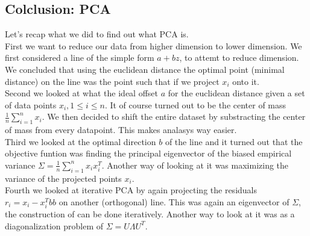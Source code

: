 		\subsection{Colclusion: PCA}
		Let's recap what we did to find out what PCA is.\\
		
		 First we want to reduce our data from higher dimension to lower dimension. We first considered a line of the simple form $a+bz$, to attemt to reduce dimension. We concluded that using the euclidean distance the optimal point (minimal distance) on the line was the point such that if we project $x_i$ onto it.\\
		 
		 Second we looked at what the ideal offset $a$ for the euclidean distance given a set of data points $x_i, 1\leq i \leq n$. It of course turned out to be the center of mass $\frac{1}{n}\sum_{i=1}^{n}x_i$. We then decided to shift the entire dataset by substracting the center of mass from every datapoint. This makes analasys way easier.\\
		 
		 Third we looked at the optimal direction $b$ of the line and it turned out that the objective funtion was finding the principal eigenvector of the biased empirical variance $\Sigma = \frac{1}{n}\sum_{i=1}^{n}x_ix_i^T$. Another way of looking at it was maximizing the variance of the projected points $x_i$.\\
		 
		 Fourth we looked at iterative PCA by again projecting the residuals $r_i = x_i - x_i^Tbb$ on another (orthogonal) line. This was again an eigenvector of $\Sigma$, the construction of can be done iteratively. Another way to look at it was as a diagonalization problem of $\Sigma = U\Lambda U^T$.\\
		 
